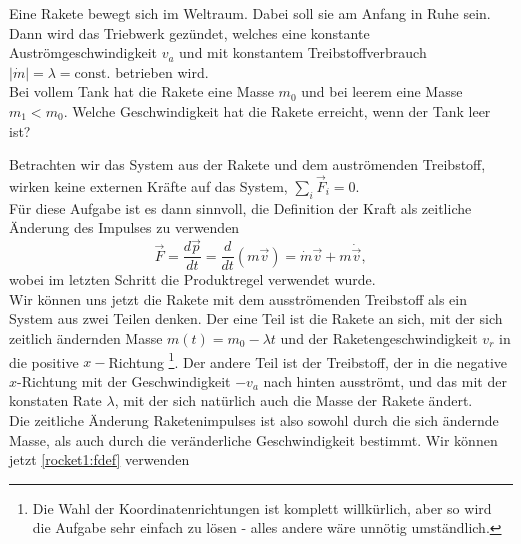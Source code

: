 \begin{Exercise}[label = rocket1, title = Rakete im Weltraum, difficulty = 4, origin = Aaron Wild]
	Eine Rakete bewegt sich im Weltraum. Dabei soll sie am Anfang in Ruhe sein. Dann wird das Triebwerk gezündet, welches eine konstante Auströmgeschwindigkeit $v_a$ und mit konstantem Treibstoffverbrauch $|\dot{m}| = \lambda =\mathrm{const.}$ betrieben wird. \\
	Bei vollem Tank hat die Rakete eine Masse $m_0$ und bei leerem eine Masse $m_1<m_0$. Welche Geschwindigkeit hat die Rakete erreicht, wenn der Tank leer ist?
\end{Exercise} 
\begin{Answer}[ref = rocket1]
	Betrachten wir das System aus der Rakete und dem auströmenden Treibstoff, wirken keine externen Kräfte auf das System, $\sum_i \vec{F}_i = 0$.\\
	Für diese Aufgabe ist es dann sinnvoll, die Definition der Kraft als zeitliche Änderung des Impulses zu verwenden
	\begin{equation}\label{rocket1:fdef}
		\vec{F} = \frac{d\vec{p}}{dt} = \frac{d}{dt}\left(m\vec{v}\right) = \dot{m}\vec{v}+ m\dot{\vec{v}},
	\end{equation}
	wobei im letzten Schritt die Produktregel verwendet wurde.\\
	Wir können uns jetzt die Rakete mit dem ausströmenden Treibstoff als ein System aus zwei Teilen denken. Der eine Teil ist die Rakete an sich, mit der sich zeitlich ändernden Masse $m\left(t\right) = m_0 - \lambda t$ und der Raketengeschwindigkeit $v_r$ in die positive $x-$Richtung \footnote{Die Wahl der Koordinatenrichtungen ist komplett willkürlich, aber so wird die Aufgabe sehr einfach zu lösen - alles andere wäre unnötig umständlich.}. Der andere Teil ist der Treibstoff, der in die negative $x$-Richtung mit der Geschwindigkeit $-v_a$ nach hinten ausströmt, und das mit der konstaten Rate $\lambda$, mit der sich natürlich auch die Masse der Rakete ändert.\\
	Die zeitliche Änderung Raketenimpulses ist also sowohl durch die sich ändernde Masse, als auch durch die veränderliche Geschwindigkeit bestimmt. Wir können jetzt \eqref{rocket1:fdef} verwenden

\end{Answer}